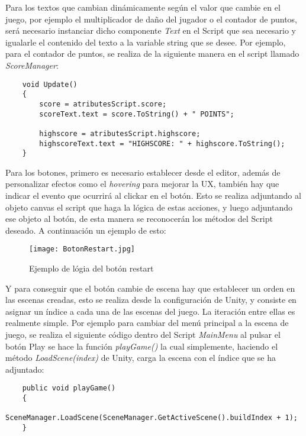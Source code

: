 Para los textos que cambian dinámicamente según el valor que cambie en el juego, por ejemplo el multiplicador de daño del jugador o el contador de puntos, será necesario instanciar dicho componente \textit{Text} en el Script que sea necesario y igualarle el contenido del texto a la variable string que se desee. Por ejemplo, para el contador de puntos, se realiza de la siguiente manera en el script llamado \textit{ScoreManager}:


\begin{lstlisting}
    void Update()
    {
        score = atributesScript.score;
        scoreText.text = score.ToString() + " POINTS";

        highscore = atributesScript.highscore;
        highscoreText.text = "HIGHSCORE: " + highscore.ToString();
    }
\end{lstlisting}

Para los botones, primero es necesario establecer desde el editor, además de personalizar efectos como el \textit{hovering} para mejorar la UX, también hay que indicar el evento que ocurrirá al clickar en el botón. Esto se realiza adjuntando al objeto canvas el script que haga la lógica de estas acciones, y luego adjuntando ese objeto al botón, de esta manera se reconocerán los métodos del Script deseado. A continuación un ejemplo de esto:

\begin{figure}[H]
    \centering
    \texttt{[image: BotonRestart.jpg]}
    \caption{Ejemplo de lógia del botón restart }
\end{figure}

Y para conseguir que el botón cambie de escena hay que establecer un orden en las escenas creadas, esto se realiza desde la configuración de Unity, y consiste en asignar un índice a cada una de las escenas del juego. La iteración entre ellas es realmente simple. Por ejemplo para cambiar del menú principal a la escena de juego, se realiza el siguiente código dentro del Script \textit{MainMenu} al pulsar el botón Play se hace la función \textit{playGame()} la cual simplemente, haciendo el método \textit{LoadScene(index)} de Unity, carga la escena con el índice que se ha adjuntado:

\begin{lstlisting}
    public void playGame()
    {
        SceneManager.LoadScene(SceneManager.GetActiveScene().buildIndex + 1);
    }
\end{lstlisting}

